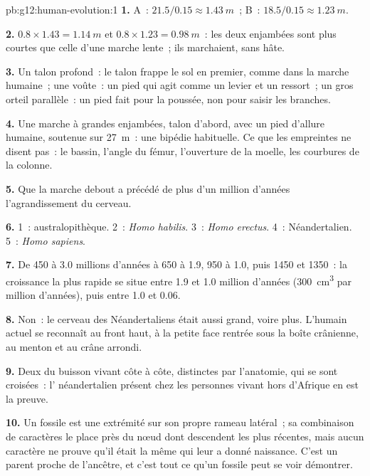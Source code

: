 \begin{solution}{pb:g12:human-evolution:1}
\textbf{1.} A~: $21.5/0.15 \approx \qty{1.43}{m}$~; B~: $18.5/0.15
\approx \qty{1.23}{m}$.

\textbf{2.} $0.8 \times 1.43 = \qty{1.14}{m}$ et $0.8 \times 1.23 =
\qty{0.98}{m}$~: les deux enjambées sont plus courtes que celle d'une
marche lente~; ils marchaient, sans hâte.

\textbf{3.} Un talon profond~: le talon frappe le sol en premier,
comme dans la marche humaine~; une voûte~: un pied qui agit comme un
levier et un ressort~; un gros orteil parallèle~: un pied fait pour la
poussée, non pour saisir les branches.

\textbf{4.} Une marche à grandes enjambées, talon d'abord, avec un
pied d'allure humaine, soutenue sur \qty{27}{m}~: une bipédie
habituelle. Ce que les empreintes ne disent pas~: le bassin, l'angle
du fémur, l'ouverture de la moelle, les courbures de la colonne.

\textbf{5.} Que la marche debout a précédé de plus d'un million
d'années l'agrandissement du cerveau.

\textbf{6.} 1~: australopithèque. 2~: \emph{Homo habilis}. 3~:
\emph{Homo erectus}. 4~: Néandertalien. 5~: \emph{Homo sapiens}.

\textbf{7.} De 450 à 3.0 millions d'années à 650 à 1.9, 950 à 1.0,
puis 1450 et 1350~: la croissance la plus rapide se situe entre 1.9 et
1.0 million d'années (\qty{300}{cm^3} par million d'années), puis
entre 1.0 et 0.06.

\textbf{8.} Non~: le cerveau des Néandertaliens était aussi grand,
voire plus. L'humain actuel se reconnaît au front haut, à la petite
face rentrée sous la boîte crânienne, au menton et au crâne arrondi.

\textbf{9.} Deux  du buisson vivant côte à côte, distinctes
par l'anatomie, qui se sont croisées~: l' néandertalien présent
chez les personnes vivant hors d'Afrique en est la preuve.

\textbf{10.} Un fossile est une extrémité sur son propre rameau
latéral~; sa combinaison de caractères le place près du nœud dont
descendent les  plus récentes, mais aucun caractère ne prouve
qu'il était la  même qui leur a donné naissance. C'est un
parent proche de l'ancêtre, et c'est tout ce qu'un fossile peut se
voir démontrer.


\end{solution}
